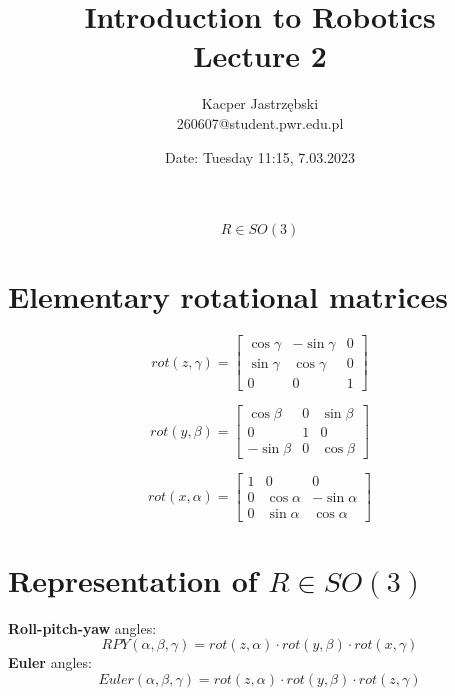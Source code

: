 \documentclass[12pt, a4paper]{extarticle}
\title{
	Introduction to Robotics \\
	\vspace{\baselineskip}
	\large
	\textbf{Lecture 2}
}
\author{
	Kacper Jastrzębski\\
	260607@student.pwr.edu.pl
}
\date{Date: Tuesday 11:15, 7.03.2023}
\begin{document}
	\maketitle
	\vspace{1.5cm}

	\tableofcontents

	\pagebreak

	\begin{equation}
		R \in SO(3)
	\end{equation}

	\section{Elementary rotational matrices}



	\begin{equation}
		rot(z, \gamma) =
		\begin{bmatrix}
			\cos{\gamma} & -\sin{\gamma} & 0\\
			\sin{\gamma} & \cos{\gamma} & 0 \\
			0 & 0 & 1
		\end{bmatrix}
	\end{equation}

	\begin{equation}
		rot(y, \beta) =
		\begin{bmatrix}
			\cos{\beta} & 0 & \sin{\beta} \\
			0 & 1 & 0 \\
			-\sin{\beta} & 0 & \cos{\beta}
		\end{bmatrix}
	\end{equation}

	\begin{equation}
		rot(x, \alpha) =
		\begin{bmatrix}
			1 & 0 & 0\\
			0 & \cos{\alpha} & -\sin{\alpha} \\
			0 & \sin{\alpha} & \cos{\alpha}
		\end{bmatrix}
	\end{equation}

	\section{Representation of $R \in SO(3)$}

	\textbf{Roll-pitch-yaw} angles:
	\begin{equation}
		RPY(\alpha, \beta, \gamma) = rot(z, \alpha) \cdot rot(y, \beta)  \cdot rot(x, \gamma)
	\end{equation}
	\textbf{Euler} angles:
	\begin{equation}
		Euler(\alpha, \beta, \gamma) = rot(z, \alpha) \cdot rot(y, \beta)  \cdot rot(z, \gamma)
	\end{equation}
\end{document}
